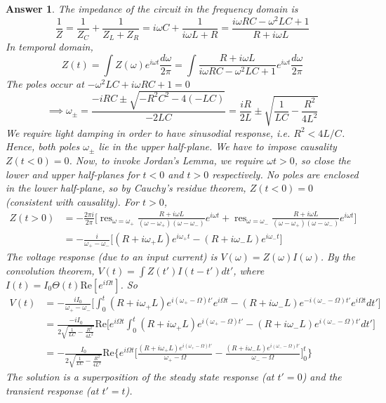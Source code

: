 \documentclass[a4paper]{article}
\DeclareMathOperator{\res}{res}
\newtheorem{ans}{Answer}[section]
\theoremstyle{new}
\begin{document}
\begin{ans}
The impedance of the circuit in the frequency domain is 
$$\frac{1}{Z}=\frac{1}{Z_C}+\frac{1}{Z_L+Z_R}=i\omega C+\frac{1}{i\omega L+R}=\frac{i\omega RC-\omega^2LC+1}{R+i\omega L}$$
In temporal domain,
$$Z(t)=\int Z(\omega)e^{i\omega t}\frac{d\omega}{2\pi}=\int\frac{R+i\omega L}{i\omega RC-\omega^2LC+1}e^{i\omega t}\frac{d\omega}{2\pi}$$
The poles occur at $-\omega^2LC+i\omega RC+1=0$
$$\implies\omega_\pm=\frac{-iRC\pm\sqrt{-R^2C^2-4(-LC)}}{-2LC}=\frac{iR}{2L}\pm\sqrt{\frac{1}{LC}-\frac{R^2}{4L^2}}$$
We require light damping in order to have sinusodial response, i.e. $R^2<4L/C$. Hence, both poles $\omega_\pm$ lie in the upper half-plane. We have to impose causality $Z(t<0)=0$. Now, to invoke Jordan's Lemma, we require $\omega t>0$, so close the lower and upper half-planes for $t<0$ and $t>0$ respectively. No poles are enclosed in the lower half-plane, so by Cauchy's residue theorem, $Z(t<0)=0$ (consistent with causality). For $t>0$,
\begin{align}
    Z(t>0)&=-\frac{2\pi i}{2\pi}\bigg[\res_{\omega=\omega_+}\frac{R+i\omega L}{(\omega-\omega_+)(\omega-\omega_-)}e^{i\omega t}+\res_{\omega=\omega_-}\frac{R+i\omega L}{(\omega-\omega_+)(\omega-\omega_-)}e^{i\omega t}\bigg]\nonumber\\&=-\frac{i}{\omega_+-\omega_-}\bigg[(R+i\omega_+L)e^{i\omega_+t}-(R+i\omega_-L)e^{i\omega_-t}\bigg]\nonumber
\end{align}
The voltage response (due to an input current) is $V(\omega)=Z(\omega)I(\omega)$. By the convolution theorem, $V(t)=\int Z(t')I(t-t')dt'$, where $I(t)=I_0\Theta(t)\text{Re}[e^{i\Omega t}]$. So
\begin{align}
    V(t)&=-\frac{iI_0}{\omega_+-\omega_-}\bigg[\int_0^t(R+i\omega_+L)e^{i(\omega_+-\Omega)t'}e^{i\Omega t}-(R+i\omega_-L)e^{-i(\omega_--\Omega)t'}e^{i\Omega t}dt'\bigg]\nonumber\\&=\frac{-iI_0}{2\sqrt{\frac{1}{LC}-\frac{R^2}{4L^2}}}\text{Re}\bigg[e^{i\Omega t}\int_0^t(R+i\omega_+L)e^{i(\omega_+-\Omega)t'}-(R+i\omega_-L)e^{i(\omega_--\Omega)t'}dt'\bigg]\nonumber\\&=-\frac{I_0}{2\sqrt{\frac{1}{LC}-\frac{R^2}{4L^2}}}\text{Re}\bigg\{e^{i\Omega t}\bigg[\frac{(R+i\omega_+L)e^{i(\omega_+-\Omega)t'}}{\omega_+-\Omega}-\frac{(R+i\omega_-L)e^{i(\omega_--\Omega)t'}}{\omega_--\Omega}\bigg]_0^t\bigg\}\nonumber
\end{align}
The solution is a superposition of the steady state response (at $t'=0$) and the transient response (at $t'=t$). 
\end{ans}
\end{document}
